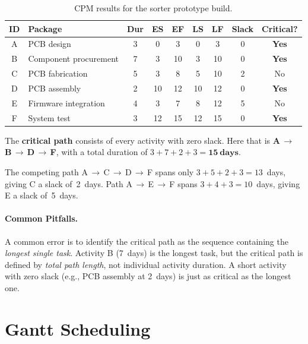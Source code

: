 \begin{table}[h]
  \centering
  \caption{CPM results for the sorter prototype build.}
  \label{tab:cpm}
  \begin{tabular}{clccccccc}
    \hline
    \textbf{ID} & \textbf{Package} & \textbf{Dur} &
    \textbf{ES} & \textbf{EF} & \textbf{LS} & \textbf{LF} &
    \textbf{Slack} & \textbf{Critical?} \\
    \hline
    A & PCB design           & 3 &  0 &  3 &  0 &  3 & 0 & \textbf{Yes} \\
    B & Component procurement & 7 &  3 & 10 &  3 & 10 & 0 & \textbf{Yes} \\
    C & PCB fabrication      & 5 &  3 &  8 &  5 & 10 & 2 & No           \\
    D & PCB assembly         & 2 & 10 & 12 & 10 & 12 & 0 & \textbf{Yes} \\
    E & Firmware integration & 4 &  3 &  7 &  8 & 12 & 5 & No           \\
    F & System test          & 3 & 12 & 15 & 12 & 15 & 0 & \textbf{Yes} \\
    \hline
  \end{tabular}
\end{table}

The \textbf{critical path} consists of every
activity with zero slack.
Here that is \textbf{A\,$\to$\,B\,$\to$\,D\,$\to$\,F}, with a total
duration of $3 + 7 + 2 + 3 = \mathbf{15\ \text{days}}$.

The competing path A\,$\to$\,C\,$\to$\,D\,$\to$\,F spans only
$3 + 5 + 2 + 3 = 13$~days, giving C a slack of~2~days.
Path A\,$\to$\,E\,$\to$\,F spans $3 + 4 + 3 = 10$~days, giving E a
slack of~5~days.

\paragraph{Common Pitfalls.}
A common error is to identify the critical path as the sequence
containing the \emph{longest single task}.
Activity B (7~days) is the longest task, but the critical path is
defined by \emph{total path length}, not individual activity duration.
A short activity with zero slack (e.g., PCB assembly at 2~days) is just
as critical as the longest one.

\section{Gantt Scheduling}
\label{sec:gantt}


